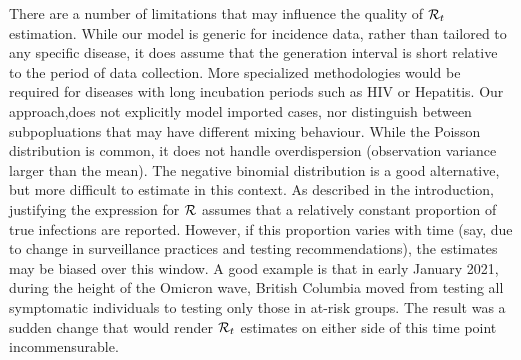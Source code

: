 


There are a number of limitations that may influence the quality of
$\mathcal{R}_t$ estimation.
While our model is
generic for incidence data, rather than tailored to any specific disease,
it does assume that the generation interval is short relative to the
period of data collection. More specialized methodologies would be required for
diseases with long incubation periods such as HIV or Hepatitis. 
Our approach,does not explicitly model imported cases, nor distinguish between
subpopluations that may have different mixing behaviour. 
While the Poisson distribution is common, it does not handle overdispersion
(observation variance larger than the mean). The negative binomial distribution
is a good alternative, but more difficult to estimate in this context.
As described in the introduction, justifying the expression for $\mathcal{R}$ assumes
that a relatively constant proportion of true infections are reported. However,
if this proportion varies with time (say, due to change in surveillance
practices and testing recommendations), the estimates may be biased over this
window. A good example is that in early January 2021, during the height of the
Omicron wave, British Columbia moved from testing all symptomatic individuals to
testing only those in at-risk groups. The result was a sudden change that would
render $\mathcal{R}_t$ estimates on either side of this time point incommensurable.

